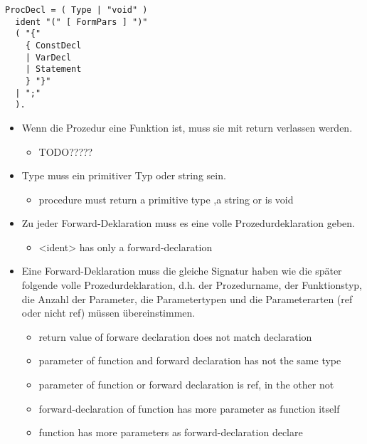 \begin{samepage}
\begin{lstlisting}[language=EBNF]
ProcDecl = ( Type | "void" )
  ident "(" [ FormPars ] ")"
  ( "{" 
    { ConstDecl 
    | VarDecl 
    | Statement 
    } "}" 
  | ";"
  ).
\end{lstlisting}
\begin{itemize}
  \item Wenn die Prozedur eine Funktion ist, muss sie mit return verlassen werden.
  \begin{itemize}
    \item TODO?????
  \end{itemize}
  \item Type muss ein primitiver Typ oder string sein.
  \begin{itemize}
    \item procedure must return a primitive type ,a string or is void
  \end{itemize}
  
  \item Zu jeder Forward-Deklaration muss es eine volle Prozedurdeklaration geben.
  \begin{itemize}
    \item <ident> has only a forward-declaration
  \end{itemize}
  \item Eine Forward-Deklaration muss die gleiche Signatur haben wie die später folgende volle Prozedurdeklaration, d.h. der Prozedurname, der Funktionstyp, die Anzahl der Parameter, die Parametertypen und die Parameterarten (ref oder nicht ref) müssen übereinstimmen.
  \begin{itemize}
    \item return value of forware declaration does not match declaration
    \item parameter of function and forward declaration has not the same type
    \item parameter of function or forward declaration is ref, in the other not
    \item forward-declaration of function has more parameter as function itself
    \item function has more parameters as forward-declaration declare
  \end{itemize}
\end{itemize}
\end{samepage}



